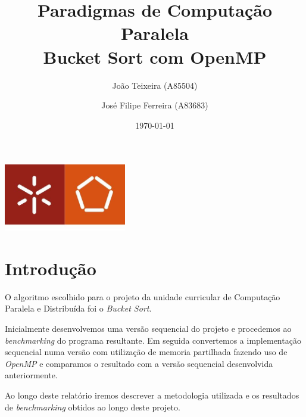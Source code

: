 \documentclass[a4paper]{report}
\begin{document}
\title{Paradigmas de Computação Paralela\\Bucket Sort com OpenMP}
\author{João Teixeira (A85504) \and José Filipe Ferreira (A83683)}
\date{\today}

\begin{center}
    \begin{minipage}{0.75\linewidth}
        \centering
        \includegraphics[width=0.4\textwidth]{images/eng.jpeg}\par\vspace{1cm}
        \vspace{1.5cm}
        \href{https://www.uminho.pt/PT}
        {\color{black}{\scshape\LARGE Universidade do Minho}} \par
        \vspace{1cm}
        \href{https://www.di.uminho.pt/}
        {\color{black}{\scshape\Large Departamento de Informática}} \par
        \vspace{1.5cm}
        \maketitle
    \end{minipage}
\end{center}

\tableofcontents

\pagebreak

\chapter{Introdução}
O algoritmo escolhido para o projeto da unidade curricular de Computação
Paralela e Distribuída foi o \textit{Bucket Sort}.

Inicialmente desenvolvemos uma versão sequencial do projeto e procedemos ao
\textit{benchmarking} do programa resultante. Em seguida convertemos a
implementação sequencial numa versão com utilização de memoria partilhada
fazendo uso de \textit{OpenMP} e comparamos o resultado com a versão sequencial
desenvolvida anteriormente.

Ao longo deste relatório iremos descrever a metodologia utilizada e os
resultados de \textit{benchmarking} obtidos ao longo deste projeto.
\end{document}

